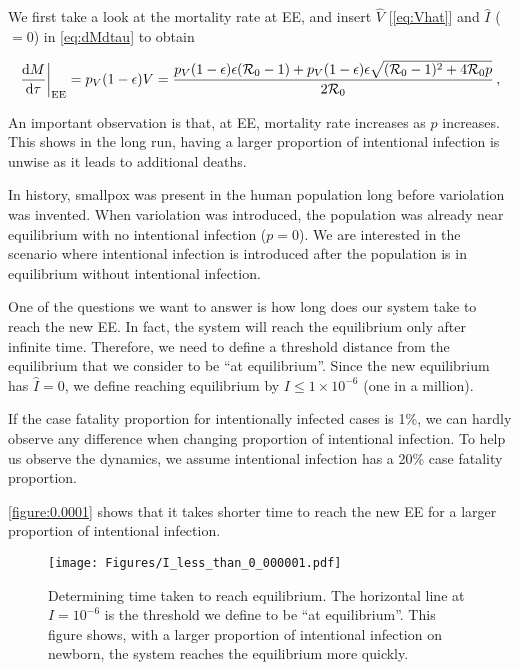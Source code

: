 \documentclass[12pt]{article}
\newcommand\dbyd[2]{\frac{\mathrm d{#1}}{\mathrm d{#2}}}
\newcommand{\R}{\mathcal{R}}
\newcommand{\pmV}{p_{V}}
\begin{document}
We first take a look at the mortality rate at EE, and insert $\hat{V}$ [\autoref{eq:Vhat}]
and $\hat{I}$ ($=0$) in \autoref{eq:dMdtau} to obtain
\begin{linenomath*}
\begin{equation}
\left. \dbyd{M}{\tau}\right|_{\rm EE}=\pmV(1-\epsilon)V=\frac{\pmV(1-\epsilon)\epsilon(\R_0 -1)+ \pmV(1-\epsilon)\epsilon \sqrt{(\R_0-1)^2+4\R_0 p}}{2\R_0}\,, \label{eq:dMdt}
\end{equation}
\end{linenomath*}

An important observation is that, at EE, mortality rate increases as $p$ increases. This shows in the long run, having a larger proportion of intentional infection is unwise as it leads to additional deaths.

In history, smallpox was present in the human population long before variolation was invented. When variolation was introduced, the population was already near equilibrium with no intentional infection ($p=0$). We are interested in the scenario where intentional infection is introduced after the population is in equilibrium without intentional infection.

One of the questions we want to answer is how long does our system take to reach the new EE. In fact, the system will reach the equilibrium only after infinite time.  Therefore, we need to define a threshold distance from the equilibrium that we consider to be ``at equilibrium''.
Since the new equilibrium has $\hat{I}=0$, we define reaching equilibrium by $I\leq 1\times 10^{-6}$ (one in a million).

If the case fatality proportion for intentionally infected cases is 1\%, we can hardly observe any difference when changing proportion of intentional infection. To help us observe the dynamics, we assume intentional infection has a 20\% case fatality proportion.

\autoref{figure:0.0001} shows that it takes shorter time to reach the new EE for a larger proportion of intentional infection.
\begin{figure}[h]
  \centering
  \texttt{[image: Figures/I\_less\_than\_0\_000001.pdf]}
  \caption{Determining time taken to reach equilibrium.  The horizontal line at $I=10^{-6}$ is the threshold we define to be ``at equilibrium''. This figure shows, with a larger proportion of intentional infection on newborn, the system reaches the equilibrium more quickly.}
\label{figure:0.0001}
\end{figure}
\end{document}
